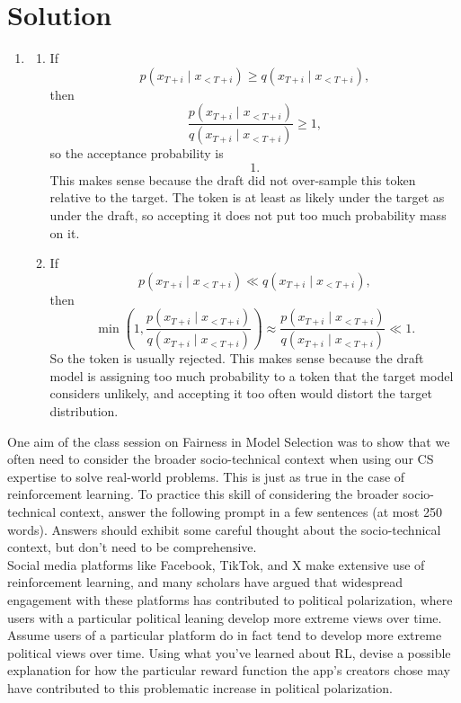 \documentclass[submit]{harvardml}
\newenvironment{solution}
  {\color{blue}\section*{Solution}}
{}
\begin{document}
\begin{solution}
\begin{enumerate}
    \item[3b.]
    \begin{enumerate}
        \item[(i)] If
        \[
        p(x_{T+i}\mid x_{<T+i})\geq q(x_{T+i}\mid x_{<T+i}),
        \]
        then
        \[
        \frac{p(x_{T+i}\mid x_{<T+i})}{q(x_{T+i}\mid x_{<T+i})}\geq 1,
        \]
        so the acceptance probability is
        \[
        1.
        \]
        This makes sense because the draft did not over-sample this token relative to the target. The token is at least as likely under the target as under the draft, so accepting it does not put too much probability mass on it.

        \item[(ii)] If
        \[
        p(x_{T+i}\mid x_{<T+i})\ll q(x_{T+i}\mid x_{<T+i}),
        \]
        then
        \[
        \min\left(1,\frac{p(x_{T+i}\mid x_{<T+i})}{q(x_{T+i}\mid x_{<T+i})}\right)
        \approx \frac{p(x_{T+i}\mid x_{<T+i})}{q(x_{T+i}\mid x_{<T+i})}\ll 1.
        \]
        So the token is usually rejected. This makes sense because the draft model is assigning too much probability to a token that the target model considers unlikely, and accepting it too often would distort the target distribution.
    \end{enumerate}
\end{enumerate}

\end{solution}

\newpage

\begin{problem}
    One aim of the class session on Fairness in Model Selection was to show that we often need to consider the broader socio-technical context when using our CS expertise to solve real-world problems. This is just as true in the case of reinforcement learning. To practice this skill of considering the broader socio-technical context, answer the following prompt in a few sentences (at most 250 words). Answers should exhibit some careful thought about the socio-technical context, but don't need to be comprehensive. \\

    \noindent Social media platforms like Facebook, TikTok, and X make extensive use of reinforcement learning, and many scholars have argued that widespread engagement with these platforms has contributed to political polarization, where users with a particular political leaning develop more extreme views over time. Assume users of a particular platform do in fact tend to develop more extreme political views over time. Using what you've learned about RL, devise a possible explanation for how the particular reward function the app's creators chose may have contributed to this problematic increase in political polarization.
\end{problem}
\end{document}
